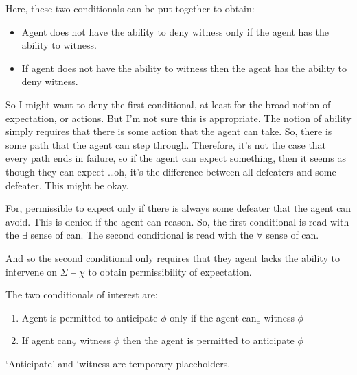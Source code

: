 \documentclass[10pt]{article}
\begin{document}
Here, these two conditionals can be put together to obtain:
\begin{itemize}
\item Agent does not have the ability to deny witness only if the agent has the ability to witness.
\item If agent does not have the ability to witness then the agent has the ability to deny witness.
\end{itemize}

So I might want to deny the first conditional, at least for the broad notion of expectation, or actions.
But I'm not sure this is appropriate.
The notion of ability simply requires that there is some action that the agent can take.
So, there is some path that the agent can step through.
Therefore, it's not the case that every path ends in failure, so if the agent can expect something, then it seems as though they can expect \dots oh, it's the difference between all defeaters and some defeater.
This might be okay.

For, permissible to expect only if there is always some defeater that the agent can avoid.
This is denied if the agent can reason.
So, the first conditional is read with the \(\exists\) sense of can.
The second conditional is read with the \(\forall\) sense of can.

And so the second conditional only requires that they agent lacks the ability to intervene on \(\Sigma \vDash \chi\) to obtain permissibility of expectation.

\newpage

The two conditionals of interest are:

\begin{enumerate}
\item Agent is permitted to anticipate \(\phi\) only if the agent can\(_{\exists}\) witness \(\phi\)
\item If agent can\(_{\forall}\) witness \(\phi\) then the agent is permitted to anticipate \(\phi\)
\end{enumerate}

`Anticipate' and `witness are temporary placeholders.
\end{document}
